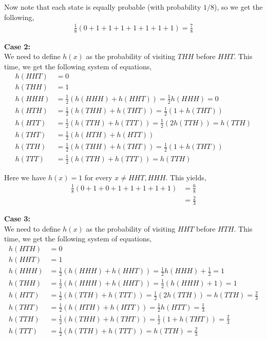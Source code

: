\documentclass[12pt]{article}
\begin{document}
Now note that each state is equally probable (with probability $1/8$), so we get the following,
\begin{align*}
\frac{1}{8}\left(0 + 1 + 1 + 1 + 1 + 1 + 1 + 1\right) = \frac{7}{8}
\end{align*}

\textbf{Case 2:}\\

We need to define $h(x)$ as the probability of visiting $THH$ before $HHT$. This time, we get the following system of equations,
\begin{align*}
h(HHT) &= 0\\
h(THH) &= 1\\
h(HHH) &= \frac{1}{2}(h(HHH) + h(HHT)) = \frac{1}{2}h(HHH) = 0\\
h(HTH) &= \frac{1}{2}(h(THH) + h(THT)) = \frac{1}{2}(1 + h(THT))\\
h(HTT) &= \frac{1}{2}(h(TTH) + h(TTT)) = \frac{1}{2}(2h(TTH)) = h(TTH)\\
h(THT) &= \frac{1}{2}(h(HTH) + h(HTT))\\
h(TTH) &= \frac{1}{2}(h(THH) + h(THT)) = \frac{1}{2}(1 + h(THT))\\
h(TTT) &= \frac{1}{2}(h(TTH) + h(TTT)) = h(TTH)
\end{align*}

Here we have $h(x) = 1$ for every $x \neq HHT, HHH$. This yields,
\begin{align*}
\frac{1}{8}\left(0 + 1 + 0 + 1 + 1 + 1 + 1 + 1\right) &= \frac{6}{8}\\
&= \frac{2}{3}
\end{align*}

\newpage
\textbf{Case 3:}\\

We need to define $h(x)$ as the probability of visiting $HHT$ before $HTH$. This time, we get the following system of equations,
\begin{align*}
h(HTH) &= 0\\
h(HHT) &= 1\\
h(HHH) &= \frac{1}{2}(h(HHH) + h(HHT)) = \frac{1}{2}h(HHH) + \frac{1}{2} = 1\\
h(THH) &= \frac{1}{2}(h(HHH) + h(HHT)) = \frac{1}{2}(h(HHH)+ 1) = 1\\
h(HTT) &= \frac{1}{2}(h(TTH) + h(TTT)) = \frac{1}{2}(2h(TTH)) = h(TTH) = \frac{2}{3}\\
h(THT) &= \frac{1}{2}(h(HTH) + h(HTT)) = \frac{1}{2}h(HTT) = \frac{1}{3}\\
h(TTH) &= \frac{1}{2}(h(THH) + h(THT)) = \frac{1}{2}(1 + h(THT)) = \frac{2}{3}\\
h(TTT) &= \frac{1}{2}(h(TTH) + h(TTT)) = h(TTH) = \frac{2}{3}
\end{align*}
\end{document}
